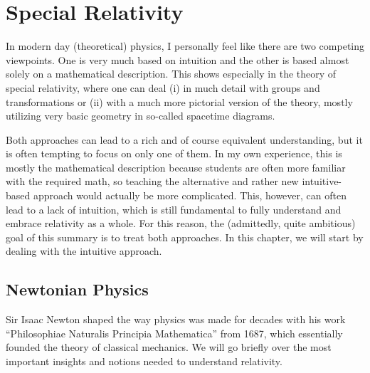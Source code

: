 \documentclass[../relativity_main.tex]{subfiles}
\begin{document}
\chapter{Special Relativity}

\begin{center}
In modern day (theoretical) physics, I personally feel like there are two competing viewpoints. One is very much based on intuition and the other is based almost solely on a mathematical description. This shows especially in the theory of special relativity, where one can deal (i) in much detail with groups and transformations or (ii) with a much more pictorial version of the theory, mostly utilizing very basic geometry in so-called spacetime diagrams.

Both approaches can lead to a rich and of course equivalent understanding, but it is often tempting to focus on only one of them. In my own experience, this is mostly the mathematical description because students are often more familiar with the required math, so teaching the alternative and rather new intuitive-based approach would actually be more complicated. This, however, can often lead to a lack of intuition, which is still fundamental to fully understand and embrace relativity as a whole. For this reason, the (admittedly, quite ambitious) goal of this summary is to treat both approaches. In this chapter, we will start by dealing with the intuitive approach.
\end{center}





\newpage



	\section{Newtonian Physics}
Sir Isaac Newton shaped the way physics was made for decades with his work \enquote{Philosophiae Naturalis Principia Mathematica} from 1687, which essentially founded the theory of classical mechanics. We will go briefly over the most important insights and notions needed to understand relativity.
\end{document}
